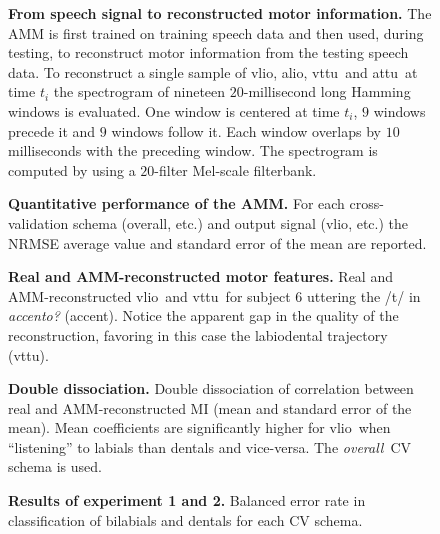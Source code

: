 \documentclass[10pt]{article}
\newcommand{\vlio}{\textsf{vlio}}
\newcommand{\vttu}{\textsf{vttu}}
\newcommand{\alio}{\textsf{alio}}
\newcommand{\attu}{\textsf{attu}}
\newcommand{\overall}{\emph{overall}}
\begin{document}
\begin{figure}[t]
\begin{center}
\end{center}
\caption{{\bf From speech signal to reconstructed motor information.} The AMM is first trained on training speech data and then used, during testing, to reconstruct motor information from the testing speech data. To reconstruct a single sample of \vlio, \alio, \vttu\ and \attu\ at time $t_i$ the
spectrogram of nineteen $20$-millisecond long Hamming windows is evaluated.
One window is centered at time $t_i$, $9$ windows precede it
and $9$ windows follow it. Each window overlaps by $10$ milliseconds
with the preceding window. The spectrogram is computed by using a
$20$-filter Mel-scale filterbank.}
\label{fig:amm}
\end{figure}

\begin{figure}[ht]
\begin{center}
\end{center} 
\caption{{\bf Quantitative performance of the AMM.} For each cross-validation schema (overall, etc.)
and output signal (\vlio, etc.) the NRMSE average value and standard error of the mean
are reported.} \label{fig:amm_perf}
\end{figure}

\begin{figure}[t]
\caption{{\bf Real and AMM-reconstructed motor features.} Real and AMM-reconstructed \vlio\ and \vttu\ for subject $6$ uttering
the /t/ in \emph{accento?} (accent). Notice the apparent gap in the quality
of the reconstruction, favoring in this case the labiodental trajectory (\vttu).}
\label{fig:example}
\end{figure}

\begin{figure}[t]
\caption{{\bf Double dissociation.} Double dissociation of correlation between real and AMM-reconstructed MI
(mean and standard error of the mean). Mean coefficients are significantly
higher for \vlio\ when ``listening'' to labials than dentals and vice-versa.
The \overall\ CV schema is used.}
\label{fig:DD}
\end{figure}

\begin{figure}[ht]
\begin{center}
\end{center} 
\caption{ {\bf Results of experiment 1 and 2.} Balanced error rate in classification of bilabials and dentals for each
CV schema.}
\label{fig:class2_perf}
\end{figure}
\end{document}
